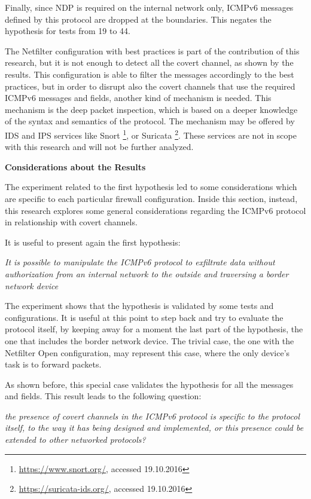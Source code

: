 \documentclass[12pt]{article}
\begin{document}
Finally, since NDP is required on the internal network only, ICMPv6 messages defined by this protocol are dropped at the boundaries. This negates the hypothesis for tests from 19 to 44.

The Netfilter configuration with best practices is part of the contribution of this research, but it is not enough to detect all the covert channel, as shown by the results. This configuration is able to filter the messages accordingly to the best practices, but in order to disrupt also the covert channels that use the required ICMPv6 messages and fields, another kind of mechanism is needed. This mechanism is the deep packet inspection, which is based on a deeper knowledge of the syntax and semantics of the protocol. The mechanism may be offered by IDS and IPS services like Snort \footnote{\url{https://www.snort.org/}, accessed 19.10.2016}, or Suricata \footnote{\url{https://suricata-ids.org/}, accessed 19.10.2016}. These services are not in scope with this research and will not be further analyzed.


\textbf{Considerations about the Results}
\label{resultsFirstComparison}

The experiment related to the first hypothesis led to some considerations which are specific to each particular firewall configuration. Inside this section, instead, this research explores some general considerations regarding the ICMPv6 protocol in relationship with covert channels.

It is useful to present again the first hypothesis:

\textit{It is possible to manipulate the ICMPv6 protocol to exfiltrate data without authorization from an internal network to the outside and traversing a border network device}

The experiment shows that the hypothesis is validated by some tests and configurations. It is useful at this point to step back and try to evaluate the protocol itself, by keeping away for a moment the last part of the hypothesis, the one that includes the border network device. The trivial case, the one with the Netfilter Open configuration, may represent this case, where the only device's task is to forward packets.

As shown before, this special case validates the hypothesis for all the messages and fields. This result leads to the following question:

\textit{the presence of covert channels in the ICMPv6 protocol is specific to the protocol itself, to the way it has being designed and implemented, or this presence could be extended to other networked protocols?}
\end{document}
